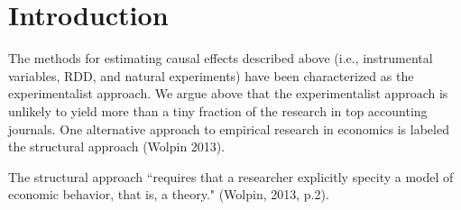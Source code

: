\section{Introduction}

The methods for estimating causal effects described above (i.e., instrumental variables, RDD, and natural experiments) have been characterized as the experimentalist approach. 
We argue above that the experimentalist approach is unlikely to yield more than a tiny fraction of the research in top accounting journals. One alternative approach to empirical research in economics is labeled the structural approach (Wolpin 2013).

The structural approach ``requires that a researcher explicitly specity a model of economic behavior, that is, a theory." (Wolpin, 2013, p.2).
